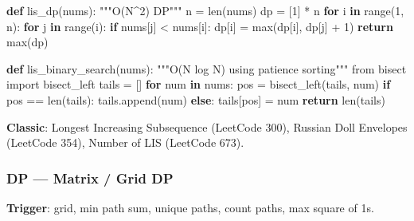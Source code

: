 \documentclass[11pt]{article}
\newenvironment{Shaded}{\begin{snugshade}}{\end{snugshade}}
\newcommand{\BuiltInTok}[1]{\textcolor[rgb]{0.50,0.55,0.55}{#1}}
\newcommand{\CommentTok}[1]{\textcolor[rgb]{0.48,0.49,0.49}{#1}}
\newcommand{\ControlFlowTok}[1]{\textcolor[rgb]{0.99,0.74,0.29}{\textbf{#1}}}
\newcommand{\DecValTok}[1]{\textcolor[rgb]{0.96,0.45,0.00}{#1}}
\newcommand{\ImportTok}[1]{\textcolor[rgb]{0.15,0.68,0.38}{#1}}
\newcommand{\KeywordTok}[1]{\textcolor[rgb]{0.81,0.81,0.76}{\textbf{#1}}}
\newcommand{\NormalTok}[1]{\textcolor[rgb]{0.81,0.81,0.76}{#1}}
\newcommand{\OperatorTok}[1]{\textcolor[rgb]{0.81,0.81,0.76}{#1}}
\begin{document}

\begin{Shaded}
\begin{Highlighting}[]
\KeywordTok{def}\NormalTok{ lis\_dp(nums):}
    \CommentTok{"""O(N\^{}2) DP"""}
\NormalTok{    n }\OperatorTok{=} \BuiltInTok{len}\NormalTok{(nums)}
\NormalTok{    dp }\OperatorTok{=}\NormalTok{ [}\DecValTok{1}\NormalTok{] }\OperatorTok{*}\NormalTok{ n}
    \ControlFlowTok{for}\NormalTok{ i }\KeywordTok{in} \BuiltInTok{range}\NormalTok{(}\DecValTok{1}\NormalTok{, n):}
        \ControlFlowTok{for}\NormalTok{ j }\KeywordTok{in} \BuiltInTok{range}\NormalTok{(i):}
            \ControlFlowTok{if}\NormalTok{ nums[j] }\OperatorTok{\textless{}}\NormalTok{ nums[i]:}
\NormalTok{                dp[i] }\OperatorTok{=} \BuiltInTok{max}\NormalTok{(dp[i], dp[j] }\OperatorTok{+} \DecValTok{1}\NormalTok{)}
    \ControlFlowTok{return} \BuiltInTok{max}\NormalTok{(dp)}

\KeywordTok{def}\NormalTok{ lis\_binary\_search(nums):}
    \CommentTok{"""O(N log N) using patience sorting"""}
    \ImportTok{from}\NormalTok{ bisect }\ImportTok{import}\NormalTok{ bisect\_left}
\NormalTok{    tails }\OperatorTok{=}\NormalTok{ []}
    \ControlFlowTok{for}\NormalTok{ num }\KeywordTok{in}\NormalTok{ nums:}
\NormalTok{        pos }\OperatorTok{=}\NormalTok{ bisect\_left(tails, num)}
        \ControlFlowTok{if}\NormalTok{ pos }\OperatorTok{==} \BuiltInTok{len}\NormalTok{(tails):}
\NormalTok{            tails.append(num)}
        \ControlFlowTok{else}\NormalTok{:}
\NormalTok{            tails[pos] }\OperatorTok{=}\NormalTok{ num}
    \ControlFlowTok{return} \BuiltInTok{len}\NormalTok{(tails)}
\end{Highlighting}
\end{Shaded}

\textbf{Classic}: Longest Increasing Subsequence (LeetCode 300), Russian Doll Envelopes (LeetCode 354), Number of LIS (LeetCode 673).

\subsubsection{DP --- Matrix / Grid DP}\label{dp--matrix--grid-dp}

\textbf{Trigger}: grid, min path sum, unique paths, count paths, max square of 1s.

\end{document}
